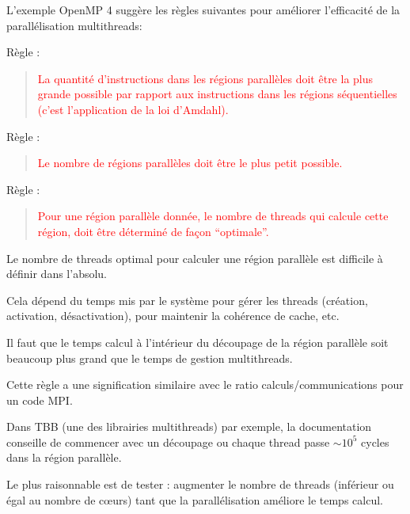 \documentclass{beamer}
\begin{document}
\begin{frame}
	L'exemple OpenMP 4 suggère les règles suivantes pour améliorer l'efficacité de la parallélisation multithreads:
	
\vfill
	Règle : 
	\begin{quote}
		\textcolor{red}{La quantité d'instructions dans les régions parallèles doit être la plus grande possible par rapport aux instructions dans les régions séquentielles (c'est l'application de la loi d'Amdahl).}
	\end{quote}

\vfill
    Règle :
	\begin{quote}
	\textcolor{red}{Le nombre de régions parallèles doit être le plus petit possible.}
    \end{quote}
\vfill

Règle :
\begin{quote}
	\textcolor{red}{Pour une région parallèle donnée, le nombre de threads qui calcule cette région, doit être déterminé de façon ``optimale''.}
\end{quote}
\vfill
\end{frame}

\begin{frame}
	Le nombre de threads optimal pour calculer une région parallèle est difficile à définir dans l'absolu.
	
\vfill
	Cela dépend du temps mis par le système pour gérer les threads (création, activation, désactivation), pour maintenir la cohérence de cache, etc.
	
\vfill
	Il faut que le temps calcul à l'intérieur du découpage de la région parallèle soit beaucoup plus grand que le temps de gestion multithreads.
	
\vfill
	Cette règle a une signification similaire avec le ratio calculs/communications pour un code MPI.
	
\end{frame}

\begin{frame}
	Dans TBB (une des librairies multithreads) par exemple, la documentation conseille de commencer avec un découpage ou chaque thread passe $\sim 10^5$ cycles dans la région parallèle.
	\bigskip
	
	Le plus raisonnable est de tester : augmenter le nombre de threads (inférieur ou égal au nombre de c\oe urs) tant que la parallélisation améliore le temps calcul.
\vfill
\end{frame}
\end{document}
